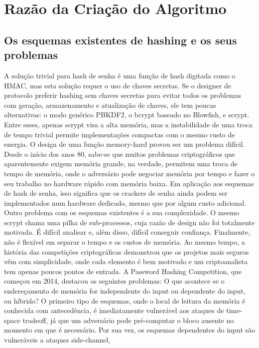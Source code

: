 \documentclass[conference]{IEEEtran}
\begin{document}
\section{Razão da Criação do Algoritmo}

\subsection{Os esquemas existentes de hashing e os seus problemas}

A solução trivial para hash de senha é uma função de hash digitada como o HMAC, mas esta solução requer o uso de chaves secretas. 
Se o designer de protocolo preferir hashing sem chaves secretas para evitar todos os problemas com geração, 
armazenamento e atualização de chaves, ele tem poucas alternativas: o modo genérico PBKDF2, 
o bcrypt baseado no Blowfish, e scrypt. Entre esses, apenas scrypt visa a alta memória, 
mas a instabilidade de uma troca de tempo trivial permite implementações compactas com o mesmo custo de energia. 
O design de uma função memory-hard provou ser um problema difícil. Desde o início dos anos 80, 
sabe-se que muitos problemas criptográficos que aparentemente exigem memória grande, na verdade, 
permitem uma troca de tempo de memória, onde o adversário pode negociar memória por tempo e 
fazer o seu trabalho no hardware rápido com memória baixa. Em aplicação aos esquemas de hash de senha, 
isso significa que os crackers de senha ainda podem ser implementados num hardware dedicado, 
mesmo que por algum custo adicional. Outro problema com os esquemas existentes é a sua complexidade. 
O mesmo scrypt chama uma pilha de sub-processos, cuja razão de design não foi totalmente motivada. É difícil analisar e, 
além disso, difícil conseguir confiança. Finalmente, não é flexível em separar o tempo e os custos de memória. 
Ao mesmo tempo, a história das competições criptográficas demonstrou que os projetos mais seguros vêm com simplicidade, 
onde cada elemento é bem motivado e um criptoanalista tem apenas poucos pontos de entrada.
A Password Hashing Competition, que começou em 2014, destacou os seguintes problemas: 
O que acontece se o endereçamento de memória for independente do input ou dependente do input, ou híbrido? 
O primeiro tipo de esquemas, onde o local de leitura da memória é conhecida com antecedência, 
é imediatamente vulnerável aos ataques de time-space tradeoff, já que um adversário pode pré-computar o bloco ausente 
no momento em que é necessário. Por sua vez, os esquemas dependentes do input são vulneráveis a ataques side-channel, 
\end{document}

